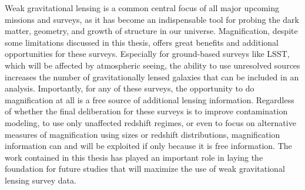 Weak gravitational lensing is a common central focus of all major upcoming missions and surveys, as it has become an indispensable tool for probing the dark matter, geometry, and growth of structure in our universe. Magnification, despite some limitations discussed in this thesis, offers great benefits and additional opportunities for these surveys. Especially for ground-based surveys like LSST, which will be affected by atmospheric seeing, the ability to use unresolved sources increases the number of gravitationally lensed galaxies that can be included in an analysis. Importantly, for any of these surveys, the opportunity to do magnification at all is a free source of additional lensing information. Regardless of whether the final deliberation for these surveys is to improve contamination modeling, to use only unaffected redshift regimes, or even to focus on alternative measures of magnification using sizes or redshift distributions, magnification information can and will be exploited if only because it is free information. The work contained in this thesis has played an important role in laying the foundation for future studies that will maximize the use of weak gravitational lensing survey data.


\endinput
Any text after an \endinput is ignored.
You could put scraps here or things in progress.
